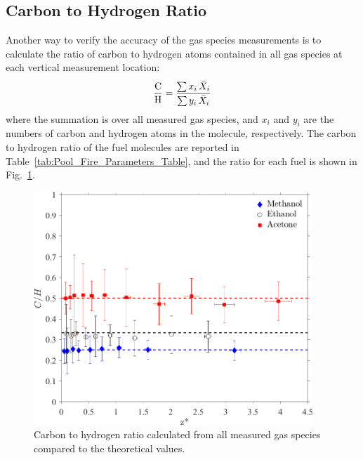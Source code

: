 \documentclass[12pt]{article}
\begin{document}
\subsection{Carbon to Hydrogen Ratio}

Another way to verify the accuracy of the gas species measurements is to calculate the ratio of carbon to hydrogen atoms contained in all gas species at each vertical measurement location:
\begin{equation}\label{eq:c2h_ratio}
  \frac{\rm C}{\rm H}=\frac{ \sum  x_i \, \bar{X}_{i} }{ \sum y_i \, \bar{X}_{i} }
\end{equation}
where the summation is over all measured gas species, and $x_i$ and $y_i$ are the numbers of carbon and hydrogen atoms in the molecule, respectively. The carbon to hydrogen ratio of the fuel molecules are reported in Table~\ref{tab:Pool_Fire_Parameters_Table}, and the ratio for each fuel is shown in Fig.~\ref{fig:C2H}.

\begin{figure}[h!]
	\centering
\includegraphics[width=10.5cm, keepaspectratio]{C2H_ratio_Comparison.png}
	\caption[Carbon to hydrogen ratio calculated from all species]{Carbon to hydrogen ratio calculated from all measured gas species compared to the theoretical values.}
	\label{fig:C2H}
\end{figure}
\end{document}
